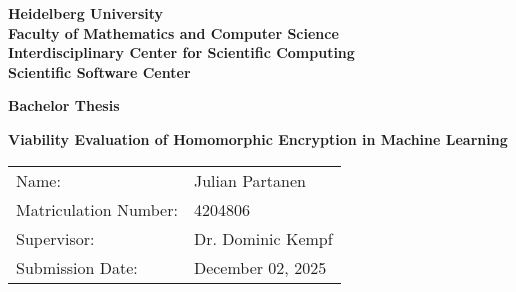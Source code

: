 \documentclass[
     12pt,         %
     a4paper,      %
     BCOR=10mm,     %
     DIV=14,        %
     liststotoc,   %
     bibtotoc,     %
     parskip=half,       %
     openright
     ]{scrreprt}
\theoremstyle{remark}
\begin{document}
\begin{titlepage}


\vspace*{1cm}
\begin{center}
\vspace*{3cm}
\textbf{
\Large Heidelberg University\\
\smallskip
\Large Faculty of Mathematics and Computer Science\\
\smallskip
\Large Interdisciplinary Center for Scientific Computing\\
\smallskip
\Large Scientific Software Center\\
\smallskip
}

\vspace{3cm}

\textbf{\large Bachelor Thesis}

\vspace{0.5\baselineskip}
{\huge
\textbf{Viability Evaluation of Homomorphic Encryption in Machine Learning}
}
\end{center}

\vfill

{\large
\begin{tabular}[l]{ll}
Name: & Julian Partanen\\
Matriculation Number: & 4204806\\
Supervisor: & Dr. Dominic Kempf\\
Submission Date: & December 02, 2025
\end{tabular}
}

\end{titlepage}




\tableofcontents
\cleardoublepage
{}








\listoffigures



%
%

\printbibliography
\end{document}
